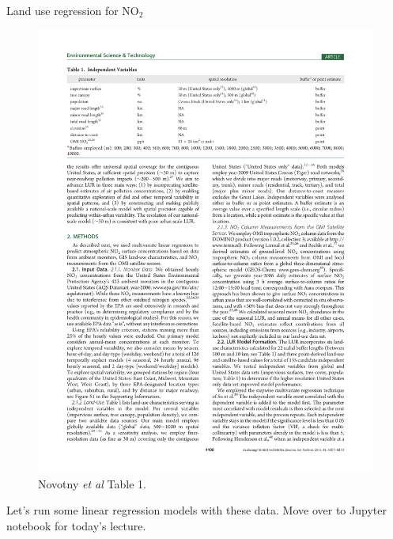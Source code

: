 \documentclass[aspectratio=169, handout]{beamer}
\begin{document}
\begin{frame}{Land use regression for NO$_2$}
\begin{figure}
\includegraphics[height=0.6\textheight]{novotny_tab1_4}
\caption*{Novotny \textit{et al} Table 1.  }
\end{figure}

\end{frame}


\begin{frame}{}
	Let's run some linear regression models with these data.  Move over to Jupyter notebook for today's lecture.

\end{frame}

	
\end{document}
